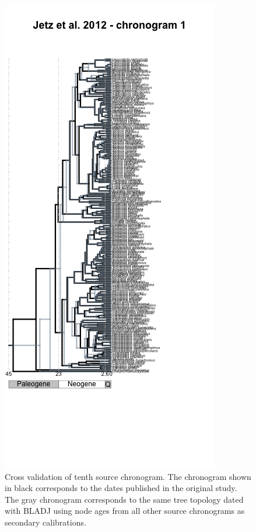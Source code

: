 \documentclass[
  english,
  man]{apa6}
\begin{document}
\begin{figure}[!h]
\includegraphics{../figures/figure-cross-validation/cross_validation_10.png}
\caption{Cross validation of tenth source chronogram. The chronogram shown in black corresponds to the dates published in the original study. The gray chronogram corresponds to the same tree topology dated with BLADJ using node ages from all other source chronograms as secondary calibrations.}
\label{fig:cv10}
\end{figure}
\end{document}
